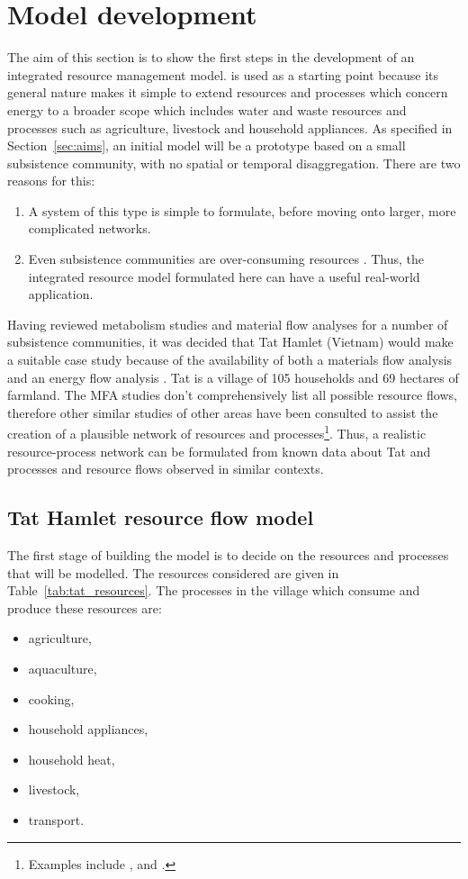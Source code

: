 \section{Model development} \label{sec:models}
The aim of this section is to show the first steps in the development of an integrated resource management model. \citet{Samsatli} is used as a starting point because its general nature makes it simple to extend resources and processes which concern energy to a broader scope which includes water and waste resources and processes such as agriculture, livestock and household appliances. As specified in Section~\ref{sec:aims}, an initial model will be a prototype based on a small subsistence community, with no spatial or temporal disaggregation. There are two reasons for this: 
\begin{enumerate}
	\item A system of this type is simple to formulate, before moving onto larger, more complicated networks.
	\item Even subsistence communities are over-consuming resources \citep{Hobbes2005, Hobbes2007, Schandl2006, Haberl2001b}. Thus, the integrated resource model formulated here can have a useful real-world application.
\end{enumerate}

Having reviewed metabolism studies and material flow analyses for a number of subsistence communities, it was decided that Tat Hamlet (Vietnam) would make a suitable case study because of the availability of both a materials flow analysis \citep{Hobbes2007, Schandl2006} and an energy flow analysis \citep{Heezen2004}. Tat is a village of 105 households and 69 hectares of farmland. The MFA studies don't comprehensively list all possible resource flows, therefore other similar studies of other areas have been consulted to assist the creation of a plausible network of resources and processes\footnote{Examples include \citet{Alam1997}, \citet{Alam1999} and \citet{Tripathi2001}.}. Thus, a realistic resource-process network can be formulated from known data about Tat and processes and resource flows observed in similar contexts. 

\subsection{Tat Hamlet resource flow model}
The first stage of building the model is to decide on the resources and processes that will be modelled. The resources considered are given in Table~\ref{tab:tat_resources}. The processes in the village which consume and produce these resources are:
\begin{itemize}
	\item agriculture,
	\item aquaculture,
	\item cooking,
	\item household appliances,
	\item household heat,
	\item livestock,
	\item transport.
\end{itemize}

